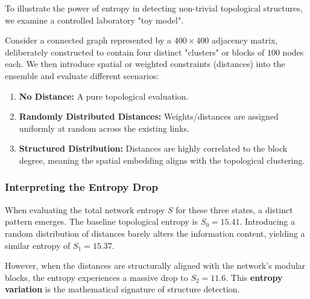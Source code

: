 To illustrate the power of entropy in detecting non-trivial topological structures, we examine a controlled laboratory "toy model".


Consider a connected graph represented by a \(400 \times 400\) adjacency matrix, deliberately constructed to contain four distinct "clusters" or blocks of \(100\) nodes each. We then introduce spatial or weighted constraints (distances) into the ensemble and evaluate different scenarios:
\begin{enumerate}
    \item \textbf{No Distance:} A pure topological evaluation.
    \item \textbf{Randomly Distributed Distances:} Weights/distances are assigned uniformly at random across the existing links.
    \item \textbf{Structured Distribution:} Distances are highly correlated to the block degree, meaning the spatial embedding aligns with the topological clustering.
\end{enumerate}

\subsubsection{Interpreting the Entropy Drop}
\label{subsubsec:interpreting_entropy_drop}


When evaluating the total network entropy \(S\) for these three states, a distinct pattern emerges. The baseline topological entropy is \(S_0 = 15.41\). Introducing a random distribution of distances barely alters the information content, yielding a similar entropy of \(S_1 = 15.37\).

However, when the distances are structurally aligned with the network's modular blocks, the entropy experiences a massive drop to \(S_2 = 11.6\). This \textbf{entropy variation} is the mathematical signature of structure detection.

